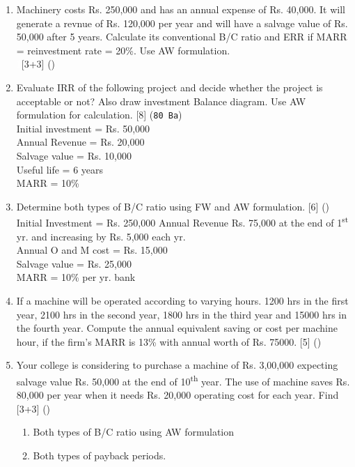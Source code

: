 \documentclass[12pt]{article}
\newcommand{\enter}{\\\textcolor{white}{1}}
\newcommand{\super}[1]{\textsuperscript{#1}}
\begin{document}
\begin{enumerate}[noitemsep, topsep = 0pt]
		\item Machinery costs Rs. 250,000 and has an annual expense of Rs. 40,000. It will generate a revnue of Rs. 120,000 per year and will have a salvage value of Rs. 50,000 after 5 years. Calculate its conventional B/C ratio and ERR if MARR = reinvestment rate = 20\%. Use AW formulation. \enter\hfill [3+3] ()
		
		\item Evaluate IRR of the following project and decide whether the project is acceptable or not? Also draw investment Balance diagram. Use AW formulation for calculation. \hfill [8] (\texttt{80 Ba})\\
		Initial investment = Rs. 50,000\\
		Annual Revenue = Rs. 20,000\\
		Salvage value = Rs. 10,000\\
		Useful life = 6 years\\
		MARR = 10\%
		
		\item Determine both types of B/C ratio using FW and AW formulation. \hfill [6] ()\\
		Initial Investment = Rs. 250,000
		Annual Revenue Rs. 75,000 at the end of 1\super{st} yr. and increasing by Rs. 5,000 each yr.\\
		Annual O and M cost = Rs. 15,000\\
		Salvage value = Rs. 25,000\\
		MARR = 10\% per yr. bank
		
		\item If a machine will be operated according to varying hours. 1200 hrs in the first year, 2100 hrs in the second year, 1800 hrs in the third year and 15000 hrs in the fourth year. Compute the annual equivalent saving or cost per machine hour, if the firm's MARR is 13\% with annual worth of Rs. 75000. \hfill [5] ()
		
		\item Your college is considering to purchase a machine of Rs. 3,00,000 expecting salvage value Rs. 50,000 at the end of 10\super{th} year. The use of machine saves Rs. 80,000 per year when it needs Rs. 20,000 operating cost for each year. Find \hfill [3+3] ()
		\begin{enumerate}[noitemsep, topsep = 0pt, label = \alph*]
			\item Both types of B/C ratio using AW formulation
			\item Both types of payback periods.
		\end{enumerate}
		

\end{enumerate}
\end{document}
